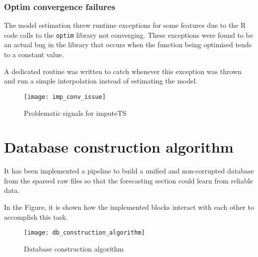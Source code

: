 \subsubsection*{Optim convergence failures}

The model estimation threw runtime exceptions for some features due to the R code calls to the \texttt{optim} library not converging. These exceptions were found to be an actual bug in the library that occurs when the function being optimised tends to a constant value. 

A dedicated routine was written to catch whenever this exception was thrown and run a simple interpolation instead of estimating the model.

\begin{figure}[H]
	\centering
	\texttt{[image: imp\_conv\_issue]}
	\caption{Problematic signals for imputeTS}
	\label{fig:imp_conv_issue}
\end{figure}

\section{Database construction algorithm}

It has been implemented a pipeline to build a unified and non-corrupted database from the sparsed raw files so that the forecasting section could learn from reliable data.

In the Figure, it is shown how the implemented blocks interact with each other to accomplish this task.

\begin{figure}[H]
	\centering
	\texttt{[image: db\_construction\_algorithm]}
	\caption{Database construction algorithm}
	\label{fig:db_construction_algorithm}
\end{figure}

